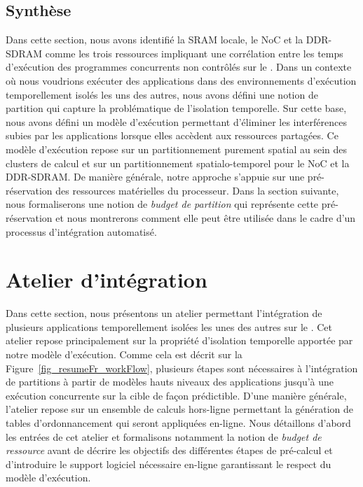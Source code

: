 \documentclass[main.tex]{subfiles}
\begin{document}
\subsection{Synthèse}
Dans cette section, nous avons identifié la SRAM locale, le NoC et la DDR-SDRAM comme les trois ressources impliquant une corrélation entre les temps d'exécution des programmes concurrents non contrôlés sur le \mppalong. Dans un contexte où nous voudrions exécuter des applications dans des environnements d'exécution temporellement isolés les uns des autres, nous avons défini une notion de partition qui capture la problématique de l'isolation temporelle. Sur cette base, nous avons défini un modèle d'exécution permettant d'éliminer les interférences subies par les applications lorsque elles accèdent aux ressources partagées. Ce modèle d'exécution repose sur un partitionnement purement spatial au sein des clusters de calcul et sur un partitionnement spatialo-temporel pour le NoC et la DDR-SDRAM. De manière générale, notre approche s'appuie sur une pré-réservation des ressources matérielles du processeur. Dans la section suivante, nous formaliserons une notion de \emph{budget de partition} qui représente cette pré-réservation et nous montrerons comment elle peut être utilisée dans le cadre d'un processus d'intégration automatisé.





\section{Atelier d'intégration}
\label{sec_resumeFr_workflow}

Dans cette section, nous présentons un atelier permettant l'intégration de plusieurs applications temporellement isolées les unes des autres sur le \mppalong. Cet atelier repose principalement sur la propriété d'isolation temporelle apportée par notre modèle d'exécution. Comme cela est décrit sur la Figure~\ref{fig_resumeFr_workFlow}, plusieurs étapes sont nécessaires à l'intégration de partitions à partir de modèles hauts niveaux des applications jusqu'à une exécution concurrente sur la cible de façon prédictible. D'une manière générale, l'atelier repose sur un ensemble de calculs hors-ligne permettant la génération de tables d'ordonnancement qui seront appliquées en-ligne. Nous détaillons d'abord les entrées de cet atelier et formalisons notamment la notion de \emph{budget de ressource} avant de décrire les objectifs des différentes étapes de pré-calcul et d'introduire le support logiciel nécessaire en-ligne garantissant le respect du modèle d'exécution.
\end{document}
